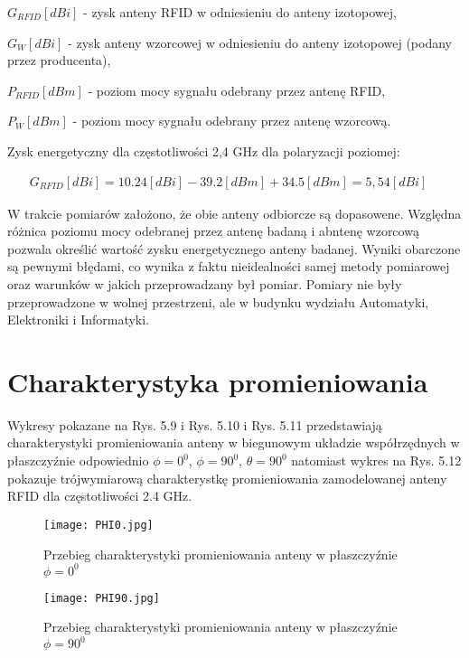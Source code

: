 \noindent
\newline$G_{RFID}[dBi]$ - zysk anteny RFID w odniesieniu do anteny izotopowej, 


\noindent
\newline $G_{W}[dBi]$ - zysk anteny wzorcowej w odniesieniu do anteny izotopowej (podany przez producenta),

\noindent
\newline $P_{RFID}[dBm]$ - poziom mocy sygnału odebrany przez antenę RFID,


\noindent
\newline $P_W[dBm]$ - poziom mocy sygnału odebrany przez antenę wzorcową.

\noindent
\newline Zysk energetyczny dla częstotliwości 2,4 GHz dla polaryzacji poziomej:

\begin{align}
G_{RFID}[dBi] = 10.24[dBi] - 39.2[dBm] + 34.5[dBm] = 5,54[dBi]
\quad
\end{align}




W trakcie pomiarów założono, że obie anteny odbiorcze są dopasowene. Względna różnica poziomu mocy odebranej przez antenę badaną i abntenę wzorcową pozwala określić wartość zysku energetycznego anteny badanej. Wyniki obarczone są pewnymi błędami, co wynika z faktu nieidealności samej metody pomiarowej oraz warunków w jakich przeprowadzany był pomiar. Pomiary nie były przeprowadzone w wolnej przestrzeni, ale w budynku wydziału Automatyki, Elektroniki i Informatyki.

\newpage
\section{Charakterystyka promieniowania}
Wykresy pokazane na Rys. 5.9 i Rys. 5.10 i Rys. 5.11 przedstawiają charakterystyki promieniowania anteny w biegunowym układzie współrzędnych w płaszczyźnie odpowiednio $\phi = 0^{0}$, $\phi = 90^{0}$, $\theta = 90^{0}$ natomiast wykres na Rys. 5.12 pokazuje trójwymiarową charakterystkę promieniowania zamodelowanej anteny RFID dla częstotliwości 2.4 GHz.

\begin{figure}[H]
\centering
	\texttt{[image: PHI0.jpg]}
	\caption{Przebieg charakterystyki promieniowania anteny w płaszczyźnie $\phi = 0^{0}$}
\end{figure}


\begin{figure}[H]
\centering
	\texttt{[image: PHI90.jpg]}
	\caption{Przebieg charakterystyki promieniowania anteny w płaszczyźnie $\phi = 90^{0}$}
\end{figure}

